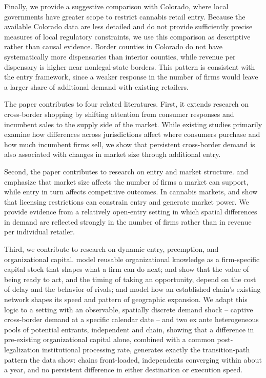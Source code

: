 \documentclass[english,12pt]{article}
\begin{document}
Finally, we provide a suggestive comparison with Colorado, where local governments have greater scope to restrict cannabis retail entry. Because the available Colorado data are less detailed and do not provide sufficiently precise measures of local regulatory constraints, we use this comparison as descriptive rather than causal evidence. Border counties in Colorado do not have systematically more dispensaries than interior counties, while revenue per dispensary is higher near nonlegal-state borders. This pattern is consistent with the entry framework, since a weaker response in the number of firms would leave a larger share of additional demand with existing retailers.

The paper contributes to four related literatures. First, it extends research on cross-border shopping by shifting attention from consumer responses and incumbent sales to the supply side of the market. While existing studies primarily examine how differences across jurisdictions affect where consumers purchase and how much incumbent firms sell, we show that persistent cross-border demand is also associated with changes in market size through additional entry.

Second, the paper contributes to research on entry and market structure. \citet{BresnahanReiss1991} and \citet{BerryReiss2007} emphasize that market size affects the number of firms a market can support, while entry in turn affects competitive outcomes. In cannabis markets, \citet{Thomas2019} and \citet{HollenbeckUetake2021} show that licensing restrictions can constrain entry and generate market power. We provide evidence from a relatively open-entry setting in which spatial differences in demand are reflected strongly in the number of firms rather than in revenue per individual retailer.

Third, we contribute to research on dynamic entry, preemption, and organizational capital. \citet{PrescottVisscher1980} model reusable organizational knowledge as a firm-specific capital stock that shapes what a firm can do next; \citet{Dixit1989} and \citet{FudenbergTirole1985} show that the value of being ready to act, and the timing of taking an opportunity, depend on the cost of delay and the behavior of rivals; \citet{Jia2008} and \citet{Holmes2011} model how an established chain's existing network shapes its speed and pattern of geographic expansion. We adapt this logic to a setting with an observable, spatially discrete demand shock -- captive cross-border demand at a specific calendar date -- and two ex ante heterogeneous pools of potential entrants, independent and chain, showing that a difference in pre-existing organizational capital alone, combined with a common post-legalization institutional processing rate, generates exactly the transition-path pattern the data show: chains front-loaded, independents converging within about a year, and no persistent difference in either destination or execution speed.
\end{document}
